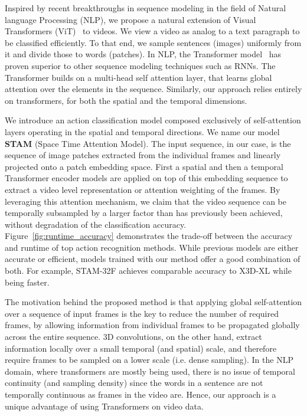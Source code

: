 \documentclass[10pt,twocolumn,letterpaper]{article}
\begin{document}
Inspired by recent breakthroughs in sequence modeling in the field of Natural language Processing (NLP), we propose a natural extension of Visual Transformers (ViT)~\cite{dosovitskiy2021an} to videos. We view a video as analog to a text paragraph to be classified efficiently. To that end, we sample sentences (images) uniformly from it and divide those to words (patches).
In NLP, the Transformer model~\cite{vaswani2017attention} has proven superior to other sequence modeling techniques such as RNNs. The Transformer builds on a multi-head self attention layer, that learns global attention over the elements in the sequence. Similarly, our approach relies entirely on transformers, for both the spatial and the temporal dimensions.



We introduce an action classification model composed exclusively of self-attention layers operating in the spatial and temporal directions.  We name our model \textbf{STAM} (Space Time Attention Model).  The input sequence, in our case, is the sequence of image patches extracted from the individual frames and linearly projected onto a patch embedding space. First a spatial and then a temporal Transformer encoder models are applied on top of this embedding sequence to extract a video level representation or attention weighting of the frames. By leveraging this attention mechanism, we claim that the video sequence can be temporally subsampled by a larger factor than has previously been achieved, without degradation of the classification accuracy. \\ Figure~\ref{fig:runtime_accuracy} demonstrates the trade-off between the accuracy and runtime of top action recognition methods. While previous models are either accurate or efficient, models trained with our method offer a good combination of both. For example, STAM-32F achieves comparable accuracy to X3D-XL while being  faster.  

The motivation behind the proposed method is that applying global self-attention over a sequence of input frames is the key to reduce the number of required frames, by allowing information from individual frames to be propagated globally across the entire sequence. 3D convolutions, on the other hand, extract information locally over a small temporal (and spatial) scale, and therefore require frames to be sampled on a lower scale (i.e. dense sampling).  
In the NLP domain, where transformers are mostly being used, there is no issue of temporal continuity (and sampling density) since the words in a sentence are not temporally continuous as frames in the video are. Hence, our approach is a unique advantage of using Transformers on video data. 
\end{document}
